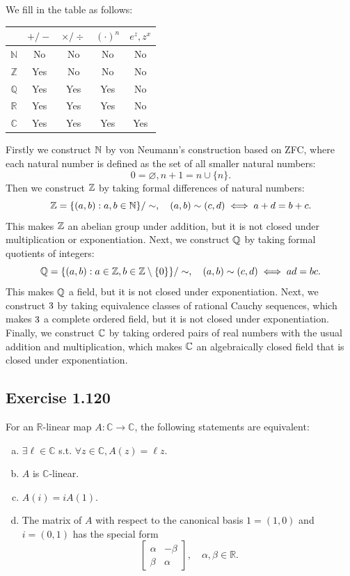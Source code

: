 \documentclass{article}
\begin{document}
\begin{solution}
  We fill in the table as follows:
  \begin{center}
    \begin{tabular}{|c|c|c|c|c|}
      \hline
      & $+/-$ & $\times/\div$ & $(\cdot)^n$ & $e^z, z^x$ \\ \hline
      $\mathbb{N}$ & No & No & No & No \\ \hline
      $\mathbb{Z}$ & Yes & No & No & No \\ \hline
      $\mathbb{Q}$ & Yes & Yes & Yes & No \\ \hline
      $\mathbb{R}$ & Yes & Yes & Yes & No \\ \hline
      $\mathbb{C}$ & Yes & Yes & Yes & Yes \\ \hline
    \end{tabular}
  \end{center}

  Firstly we construct $\mathbb{N}$ by von Neumann's construction based on
  ZFC, where each
  natural number is defined as the set of all smaller natural numbers:
  \[
    0 = \varnothing, n + 1 = n \cup \{n\}.
  \]
  Then we construct $\mathbb{Z}$ by taking formal differences of natural numbers:
  \[
    \mathbb{Z} = \{(a, b) : a, b \in \mathbb{N}\} / \sim, \quad (a, b) \sim (c, d)
    \iff a + d = b + c.
  \]
  This makes $\mathbb{Z}$ an abelian group under addition, but it is not closed under
  multiplication or exponentiation. Next, we construct $\mathbb{Q}$ by taking formal
  quotients of integers:
  \[
    \mathbb{Q} = \{(a, b) : a \in \mathbb{Z}, b \in \mathbb{Z} \setminus \{0\}\} / \sim,
    \quad (a, b) \sim (c, d) \iff ad = bc.
  \]
  This makes $\mathbb{Q}$ a field, but it is not closed under exponentiation.
  Next, we construct $3$ by taking equivalence classes of rational
  Cauchy sequences, which makes $3$ a complete ordered field, but it
  is not closed under exponentiation. Finally, we construct $\mathbb{C}$ by
  taking ordered pairs of real numbers with the usual addition and
  multiplication, which makes $\mathbb{C}$ an algebraically closed field that is
  closed under exponentiation.

\end{solution}

\subsection{Exercise 1.120}
For an $\mathbb{R}$-linear map $A : \mathbb{C} \to \mathbb{C}$, the
following statements are equivalent:
\begin{enumerate}[(a)]
  \item $\exists \ell \in \mathbb{C}$ s.t. $\forall z \in \mathbb{C},
    A(z) = \ell z$.
  \item $A$ is $\mathbb{C}$-linear.
  \item $A(i) = iA(1)$.
  \item The matrix of $A$ with respect to the canonical basis $1 =
    (1, 0)$ and $i = (0, 1)$ has the special form
    \[
      \begin{bmatrix}
        \alpha & -\beta \\
        \beta & \alpha
      \end{bmatrix}, \quad \alpha, \beta \in \mathbb{R}.
    \]
\end{enumerate}
\end{document}
